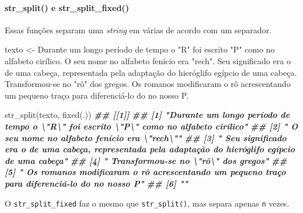 \documentclass[
]{book}
\newenvironment{Shaded}{\begin{snugshade}}{\end{snugshade}}
\newcommand{\DocumentationTok}[1]{\textcolor[rgb]{0.56,0.35,0.01}{\textbf{\textit{#1}}}}
\newcommand{\FunctionTok}[1]{\textcolor[rgb]{0.00,0.00,0.00}{#1}}
\newcommand{\NormalTok}[1]{#1}
\newcommand{\OtherTok}[1]{\textcolor[rgb]{0.56,0.35,0.01}{#1}}
\newcommand{\StringTok}[1]{\textcolor[rgb]{0.31,0.60,0.02}{#1}}
\begin{document}
\hypertarget{str_split-e-str_split_fixed}{%
\paragraph*{str\_split() e str\_split\_fixed()}\label{str_split-e-str_split_fixed}}

Essas funções separam uma \emph{string} em várias de acordo com um separador.

\begin{Shaded}
\begin{Highlighting}[]
\NormalTok{texto }\OtherTok{\textless{}{-}} \StringTok{\textquotesingle{}Durante um longo período de tempo o "R" foi escrito "P" como no alfabeto cirílico. O seu nome no alfabeto fenício era "rech". Seu significado era o de uma cabeça, representada pela adaptação do hieróglifo egípcio de uma cabeça. Transformou{-}se no "rô" dos gregos. Os romanos modificaram o rô acrescentando um pequeno traço para diferenciá{-}lo do no nosso P.\textquotesingle{}}

\FunctionTok{str\_split}\NormalTok{(texto, }\FunctionTok{fixed}\NormalTok{(}\StringTok{\textquotesingle{}.\textquotesingle{}}\NormalTok{))}
\DocumentationTok{\#\# [[1]]}
\DocumentationTok{\#\# [1] "Durante um longo período de tempo o \textbackslash{}"R\textbackslash{}" foi escrito \textbackslash{}"P\textbackslash{}" como no alfabeto cirílico"                }
\DocumentationTok{\#\# [2] " O seu nome no alfabeto fenício era \textbackslash{}"rech\textbackslash{}""                                                         }
\DocumentationTok{\#\# [3] " Seu significado era o de uma cabeça, representada pela adaptação do hieróglifo egípcio de uma cabeça"}
\DocumentationTok{\#\# [4] " Transformou{-}se no \textbackslash{}"rô\textbackslash{}" dos gregos"                                                                 }
\DocumentationTok{\#\# [5] " Os romanos modificaram o rô acrescentando um pequeno traço para diferenciá{-}lo do no nosso P"         }
\DocumentationTok{\#\# [6] ""}
\end{Highlighting}
\end{Shaded}

O \texttt{str\_split\_fixed} faz o mesmo que \texttt{str\_split()}, mas separa apenas \texttt{n} vezes.
\end{document}
